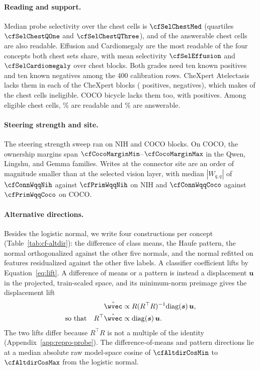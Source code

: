 \paragraph{Reading and support.} Median probe selectivity over the chest cells is $\cfSelChestMed$ (quartiles $\cfSelChestQOne$ and $\cfSelChestQThree$), and \cfReadAns{} of the \cfChestAnswerable{} answerable chest cells are also readable. Effusion and Cardiomegaly are the most readable of the four concepts both chest sets share, with mean selectivity $\cfSelEffusion$ and $\cfSelCardiomegaly$ over \cfChestProbeBlocks{} chest blocks. Both grades need ten known positives and ten known negatives among the 400 calibration rows. CheXpert Atelectasis lacks them in each of the \cfSupportInelChexBlocks{} CheXpert blocks (\cfCalChexInelPos{} positives, \cfCalChexInelNeg{} negatives), which makes \cfSupportInelChest{} of the \cfChestCellsN{} chest cells ineligible. COCO bicycle lacks them too, with \cfCalCocoInelPos{} positives. Among eligible chest cells, \cfSupportReadablePctChest\% are readable and \cfSupportAnswerablePctChest\% are answerable.



\paragraph{Steering strength and site.} The steering strength sweep ran on \cfDoseBlocksNih{} NIH and \cfDoseBlocksCoco{} COCO blocks. On COCO, the ownership margins span $\cfCocoMarginMin$--$\cfCocoMarginMax$ in the Qwen, Lingshu, and Gemma families. Writes at the connector site are an order of magnitude smaller than at the selected vision layer, with median $|W_{q,q}|$ of $\cfConnWqqNih$ against $\cfPrimWqqNih$ on NIH and $\cfConnWqqCoco$ against $\cfPrimWqqCoco$ on COCO.

\paragraph{Alternative directions.} Besides the logistic normal, we write four constructions per concept (Table~\ref{tab:cf-altdir}): the difference of class means, the Haufe pattern, the normal orthogonalized against the other five normals, and the normal refitted on features residualized against the other five labels. A classifier coefficient lifts by Equation~\ref{eq:lift}. A difference of means or a pattern is instead a displacement $\boldsymbol u$ in the projected, train-scaled space, and its minimum-norm preimage gives the displacement lift
\begin{equation}
\begin{aligned}
\hat\wvec&\propto R(R^{\top}R)^{-1}\mathrm{diag}(\boldsymbol s)\,\boldsymbol u,\\
\text{so that}\quad R^{\top}\hat\wvec&\propto\mathrm{diag}(\boldsymbol s)\,\boldsymbol u .
\end{aligned}
\label{eq:displacement-lift}
\end{equation}
The two lifts differ because $R^{\top}R$ is not a multiple of the identity (Appendix~\ref{app:repro-probe}). The difference-of-means and pattern directions lie at a median absolute raw model-space cosine of $\cfAltdirCosMin$ to $\cfAltdirCosMax$ from the logistic normal.

